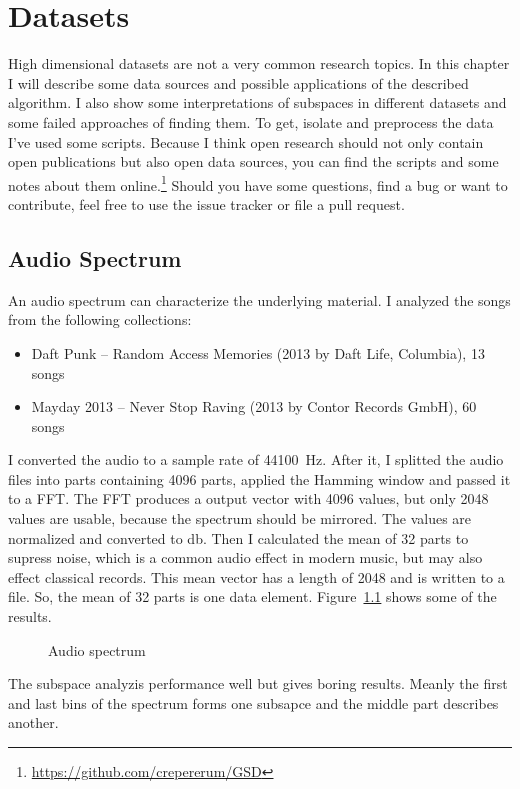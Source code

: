 \chapter{Datasets}
High dimensional datasets are not a very common research topics. In this chapter I will describe some data sources and possible applications of the described algorithm. I also show some interpretations of subspaces in different datasets and some failed approaches of finding them. To get, isolate and preprocess the data I've used some scripts. Because I think open research should not only contain open publications but also open data sources, you can find the scripts and some notes about them online.\footnote{\url{https://github.com/crepererum/GSD}} Should you have some questions, find a bug or want to contribute, feel free to use the issue tracker or file a pull request.

\section{Audio Spectrum}
An audio spectrum can characterize the underlying material. I analyzed the songs from the following collections:
\begin{itemize}
	\item Daft Punk -- Random Access Memories (2013 by Daft Life, Columbia), \num{13} songs
	\item Mayday 2013 -- Never Stop Raving (2013 by Contor Records GmbH), \num{60} songs
\end{itemize}
I converted the audio to a sample rate of \SI{44100}{\hertz}. After it, I splitted the audio files into parts containing \num{4096} parts, applied the Hamming window and passed it to a FFT. The FFT produces a output vector with \num{4096} values, but only \num{2048} values are usable, because the spectrum should be mirrored. The values are normalized and converted to \si{\decibel}. Then I calculated the mean of \num{32} parts to supress noise, which is a common audio effect in modern music, but may also effect classical records. This mean vector has a length of \num{2048} and is written to a file. So, the mean of \num{32} parts is one data element. Figure~\ref{fig:audio} shows some of the results.
\begin{figure}
	
	\caption{Audio spectrum}
	\label{fig:audio}
\end{figure}

The subspace analyzis performance well but gives boring results. Meanly the first and last bins of the spectrum forms one subsapce and the middle part describes another.

